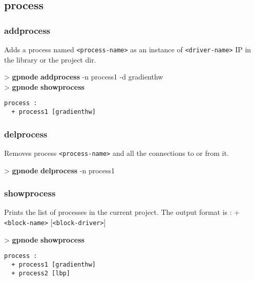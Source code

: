 \documentclass[10pt,a4paper]{article}
\begin{document}
\subsection{process}
\subsubsection{addprocess}

Adds a process named \texttt{<process-name>} as an instance of \texttt{<driver-name>} IP in the library or the project dir.

\begin{sampletitle}
> \textbf{gpnode} \textbf{addprocess} -n process1 -d gradienthw\\
> \textbf{gpnode} \textbf{showprocess}
\begin{Verbatim}
process :
  + process1 [gradienthw]
\end{Verbatim}
\end{sampletitle}

\subsubsection{delprocess}

Removes process \texttt{<process-name>} and all the connections to or from it.

\begin{sampletitle}
> \textbf{gpnode} \textbf{delprocess} -n process1
\end{sampletitle}

\subsubsection{showprocess}

Prints the list of processes in the current project. The output format is : + \texttt{<block-name>} [\texttt{<block-driver>}]

\begin{sampletitle}
> \textbf{gpnode} \textbf{showprocess}
\begin{Verbatim}
process :
  + process1 [gradienthw]
  + process2 [lbp]
\end{Verbatim}
\end{sampletitle}
\end{document}
